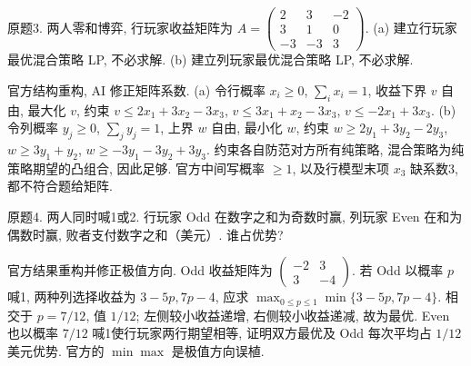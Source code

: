 \begin{exercise}\label{ass:15053-rec5-q3}
原题3. 两人零和博弈, 行玩家收益矩阵为
$A=\left(\begin{smallmatrix}2&3&-2\\3&1&0\\-3&-3&3\end{smallmatrix}\right)$.
(a) 建立行玩家最优混合策略 LP, 不必求解. (b) 建立列玩家最优混合策略 LP, 不必求解.
\end{exercise}
\begin{solution}
官方结构重构, AI 修正矩阵系数. (a) 令行概率 $x_i\ge0$, $\sum_ix_i=1$, 收益下界 $v$ 自由, 最大化 $v$, 约束
$v\le2x_1+3x_2-3x_3$, $v\le3x_1+x_2-3x_3$, $v\le-2x_1+3x_3$.
(b) 令列概率 $y_j\ge0$, $\sum_jy_j=1$, 上界 $w$ 自由, 最小化 $w$, 约束 $w\ge2y_1+3y_2-2y_3$, $w\ge3y_1+y_2$, $w\ge-3y_1-3y_2+3y_3$. 约束各自防范对方所有纯策略, 混合策略为纯策略期望的凸组合, 因此足够. 官方中间写概率 $\ge1$, 以及行模型末项 $x_3$ 缺系数3, 都不符合题给矩阵.
\end{solution}

\begin{exercise}\label{ass:15053-rec5-q4}
原题4. 两人同时喊1或2. 行玩家 Odd 在数字之和为奇数时赢, 列玩家 Even 在和为偶数时赢, 败者支付数字之和（美元）. 谁占优势?
\end{exercise}
\begin{solution}
官方结果重构并修正极值方向. Odd 收益矩阵为 $\left(\begin{smallmatrix}-2&3\\3&-4\end{smallmatrix}\right)$. 若 Odd 以概率 $p$ 喊1, 两种列选择收益为 $3-5p,7p-4$, 应求 $\max_{0\le p\le1}\min\{3-5p,7p-4\}$. 相交于 $p=7/12$, 值 $1/12$; 左侧较小收益递增, 右侧较小收益递减, 故为最优. Even 也以概率 $7/12$ 喊1使行玩家两行期望相等, 证明双方最优及 Odd 每次平均占 $1/12$ 美元优势. 官方的 $\min\max$ 是极值方向误植.
\end{solution}

